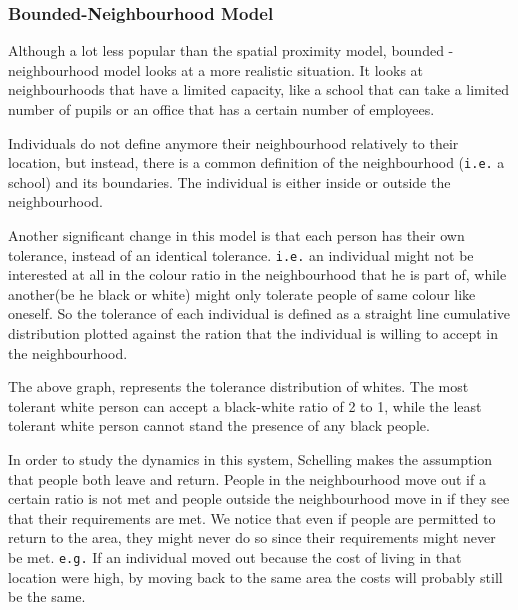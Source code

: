 \documentclass[../main.tex]{subfiles}
\begin{document}
\subsubsection{Bounded-Neighbourhood Model}
Although a lot less popular than the spatial proximity model, bounded - neighbourhood model  looks at a more realistic situation. It looks at neighbourhoods that have a limited capacity, like a school that can take a limited number of pupils or an office that has a certain number of employees.

Individuals do not define anymore their neighbourhood relatively to their location, but instead, there is a common definition of the neighbourhood (\verb|i.e.| a school) and its boundaries. The individual is either inside or outside the neighbourhood.

Another significant change in this model is that each person has their own tolerance, instead of an identical tolerance. \verb|i.e.| an individual might not be interested at all in the colour ratio in the neighbourhood that he is part of, while another(be he black or white) might only tolerate people of same colour like oneself. So the tolerance of each individual is defined as a straight line cumulative distribution plotted against the ration that the individual is willing to accept in the neighbourhood.


The above graph, represents the tolerance distribution of whites. The most tolerant white person can accept a black-white ratio of 2 to 1, while the least tolerant white person cannot stand the presence of any black people.


In order to study the dynamics in this system, Schelling makes the assumption that people both leave and return. People in the neighbourhood move out if a certain ratio is not met and people outside the neighbourhood move in if they see that their requirements are met. We notice that even if people are permitted to return to the area, they might never do so since their requirements might never be met. \verb|e.g.| If an individual moved out because the cost of living in that location were high, by moving back to the same area the costs will probably still be the same.
\end{document}

